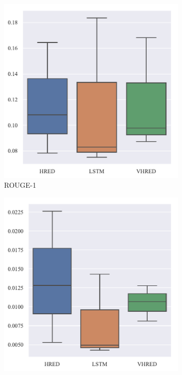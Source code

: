 \begin{figure}[H]
    \begin{subfigure}{0.3\linewidth}
        \centering
        \includegraphics[width=\linewidth]{figure/boxplot/model/rouge_1/plot.pdf}
        \caption{ROUGE-1}
    \end{subfigure}%
    \begin{subfigure}{0.3\linewidth}
        \centering
        \includegraphics[width=\linewidth]{figure/boxplot/model/rouge_2/plot.pdf}

\end{subfigure}
\end{figure}
